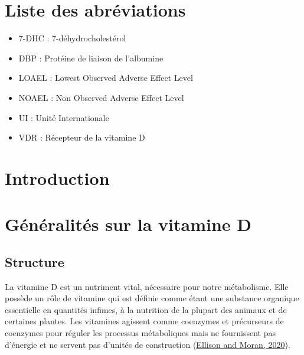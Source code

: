 \documentclass[
  a4paper,
  DIV=11,
  numbers=noendperiod,
  listof=totoc]{scrreprt}
\providecommand{\tightlist}{%
  \setlength{\itemsep}{0pt}\setlength{\parskip}{0pt}}\usepackage{longtable,booktabs,array}
\begin{document}
\hypertarget{liste-des-abruxe9viations}{%
\chapter*{Liste des abréviations}\label{liste-des-abruxe9viations}}

\begin{itemize}
\tightlist
\item
  7-DHC : 7-déhydrocholestérol
\item
  DBP : Protéine de liaison de l'albumine
\item
  LOAEL : Lowest Observed Adverse Effect Level
\item
  NOAEL : Non Observed Adverse Effect Level
\item
  UI : Unité Internationale
\item
  VDR : Récepteur de la vitamine D
\end{itemize}

\newpage{}

\hypertarget{introduction}{%
\chapter{Introduction}\label{introduction}}


\newpage{}

\hypertarget{guxe9nuxe9ralituxe9s-sur-la-vitamine-d}{%
\chapter{Généralités sur la vitamine
D}\label{guxe9nuxe9ralituxe9s-sur-la-vitamine-d}}

\hypertarget{structure}{%
\section{Structure}\label{structure}}

La vitamine D est un nutriment vital, nécessaire pour notre métabolisme.
Elle possède un rôle de vitamine qui est définie comme étant une
substance organique essentielle en quantités infimes, à la nutrition de
la plupart des animaux et de certaines plantes. Les vitamines agissent
comme coenzymes et précurseurs de coenzymes pour réguler les processus
métaboliques mais ne fournissent pas d'énergie et ne servent pas
d'unités de construction (\protect\hyperlink{ref-Ellison.2020}{Ellison
and Moran, 2020}).
\end{document}
